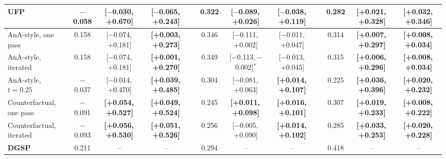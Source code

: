 \documentclass[10pt,letterpaper]{article}
\newcommand{\method}{DGSP\xspace}
\newcommand{\ci}[2]{[#1,\allowbreak\,#2]}
\newcommand{\best}[1]{\textbf{#1}}
\newcommand{\oursrow}{\rowcolor{oursbg}}
\newcommand{\na}{--}
\newcommand{\sw}{$^{\ast}$}   %
\theoremstyle{remark}
\theoremstyle{plain}
\theoremstyle{definition}
\begin{document}
\begin{landscape}
\begin{table}[!h]
\begin{tabular}{@{}lccccccccccc@{}}
UFP & $-$0.058 & \ci{$-$0.030}{+0.670} & \ci{$-$0.065}{+0.243} &  & 0.322 & \ci{$-$0.089}{+0.026} & \ci{$-$0.038}{+0.119} &  & 0.282 & \best{\ci{+0.021}{+0.328}} & \best{\ci{+0.032}{+0.346}} \\
\midrule
AnA-style, one pass & 0.158 & \ci{$-$0.074}{+0.181} & \best{\ci{+0.003}{+0.273}} &  & 0.346 & \ci{$-$0.111}{+0.002} & \ci{$-$0.011}{+0.047} &  & 0.314 & \best{\ci{+0.007}{+0.297}} & \best{\ci{+0.008}{+0.034}} \\
AnA-style, iterated & 0.158 & \ci{$-$0.074}{+0.181} & \best{\ci{+0.001}{+0.270}} &  & 0.349 & \ci{$-$0.113}{$-$0.002}\sw & \ci{$-$0.013}{+0.045} &  & 0.315 & \best{\ci{+0.006}{+0.296}} & \best{\ci{+0.008}{+0.034}} \\
AnA-style, $t=0.25$ & $-$0.037 & \ci{$-$0.014}{+0.470} & \best{\ci{+0.039}{+0.485}} &  & 0.304 & \ci{$-$0.081}{+0.063} & \best{\ci{+0.014}{+0.107}} &  & 0.225 & \best{\ci{+0.036}{+0.396}} & \best{\ci{+0.020}{+0.232}} \\
Counterfactual, one pass & $-$0.091 & \best{\ci{+0.054}{+0.527}} & \best{\ci{+0.049}{+0.524}} &  & 0.245 & \best{\ci{+0.011}{+0.098}} & \best{\ci{+0.016}{+0.101}} &  & 0.307 & \best{\ci{+0.019}{+0.233}} & \best{\ci{+0.008}{+0.222}} \\
Counterfactual, iterated & $-$0.093 & \best{\ci{+0.056}{+0.530}} & \best{\ci{+0.051}{+0.526}} &  & 0.256 & \ci{$-$0.005}{+0.090} & \best{\ci{+0.014}{+0.102}} &  & 0.285 & \best{\ci{+0.033}{+0.253}} & \best{\ci{+0.020}{+0.228}} \\
\midrule
\oursrow \textbf{\method} & 0.211 & \na & \na &  & 0.294 & \na & \na &  & 0.418 & \na & \na \\
\bottomrule
\end{tabular}
\end{table}
\clearpage


\end{landscape}
\end{document}
